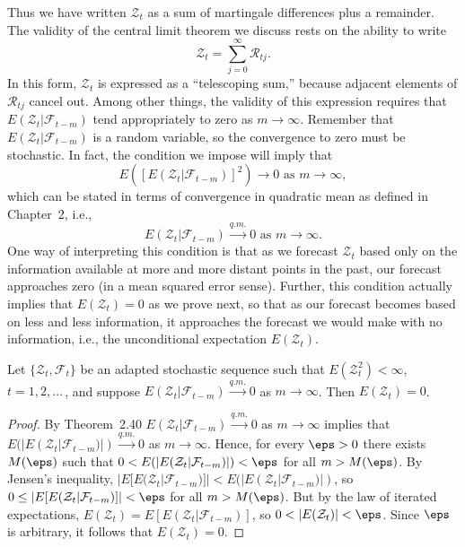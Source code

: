 Thus we have written $\mathcal{Z}_t$ as a sum of martingale differences plus a remainder. The validity of the central limit theorem we discuss rests on the ability to write
\[
\mathcal{Z}_t = \sum_{j=0}^{\infty} \mathcal{R}_{tj}.
\]
In this form, $\mathcal{Z}_t$ is expressed as a ``telescoping sum,'' because adjacent elements of $\mathcal{R}_{tj}$ cancel out. Among other things, the validity of this expression requires that $E(\mathcal{Z}_t|\mathcal{F}_{t-m})$ tend appropriately to zero as $m \to \infty$. Remember that $E(\mathcal{Z}_t|\mathcal{F}_{t-m})$ is a random variable, so the convergence to zero must be stochastic. In fact, the condition we impose will imply that
\[
E([E(\mathcal{Z}_t|\mathcal{F}_{t-m})]^2) \to 0 \text{ as } m \to \infty,
\]
which can be stated in terms of convergence in quadratic mean as defined in Chapter~2, i.e.,
\[
E(\mathcal{Z}_t|\mathcal{F}_{t-m}) \xrightarrow{q.m.} 0 \text{ as } m \to \infty.
\]
One way of interpreting this condition is that as we forecast $\mathcal{Z}_t$ based only on the information available at more and more distant points in the past, our forecast approaches zero (in a mean squared error sense). Further, this condition actually implies that $E(\mathcal{Z}_t) = 0$ as we prove next, so that as our forecast becomes based on less and less information, it approaches the forecast we would make with no information, i.e., the unconditional expectation $E(\mathcal{Z}_t)$.

\begin{lemma}\label{lem:qm-zero-mean}
Let $\{\mathcal{Z}_t, \mathcal{F}_t\}$ be an adapted stochastic sequence such that $E(\mathcal{Z}_t^2) < \infty$, $t = 1, 2, \ldots$\,, and suppose $E(\mathcal{Z}_t|\mathcal{F}_{t-m}) \xrightarrow{q.m.} 0$ as $m \to \infty$. Then $E(\mathcal{Z}_t) = 0$.
\end{lemma}

\begin{proof}
By Theorem~2.40 $E(\mathcal{Z}_t|\mathcal{F}_{t-m}) \xrightarrow{q.m.} 0$ as $m \to \infty$ implies that $E(|E(\mathcal{Z}_t|\mathcal{F}_{t-m})|) \xrightarrow{q.m.} 0$ as $m \to \infty$. Hence, for every $\eps > 0$ there exists $M(\eps)$ such that $0 < E(|E(\mathcal{Z}_t|\mathcal{F}_{t-m})|) < \eps$ for all $m > M(\eps)$. By Jensen's inequality, $|E[E(\mathcal{Z}_t|\mathcal{F}_{t-m})]| < E(|E(\mathcal{Z}_t|\mathcal{F}_{t-m})|)$, so $0 \leq |E[E(\mathcal{Z}_t|\mathcal{F}_{t-m})]| < \eps$ for all $m > M(\eps)$. But by the law of iterated expectations, $E(\mathcal{Z}_t) = E[E(\mathcal{Z}_t|\mathcal{F}_{t-m})]$, so $0 < |E(\mathcal{Z}_t)| < \eps$. Since $\eps$ is arbitrary, it follows that $E(\mathcal{Z}_t) = 0$.
\end{proof}

